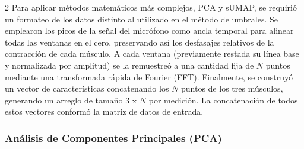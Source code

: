\documentclass[11pt, letterpaper]{article}
\begin{document}
\begin{multicols*}{2}
Para aplicar métodos matemáticos más complejos, PCA y sUMAP, se requirió un formateo de los datos distinto al utilizado en el método de umbrales. Se emplearon los picos de la señal del micrófono como ancla temporal para alinear todas las ventanas en el cero, preservando así los desfasajes relativos de la contracción de cada músculo. A cada ventana (previamente restada su línea base y normalizada por amplitud) se la remuestreó a una cantidad fija de $N$ puntos mediante una transformada rápida de Fourier (FFT). Finalmente, se construyó un vector de características concatenando los $N$ puntos de los tres músculos, generando un arreglo de tamaño $3$ x $N$ por medición. La concatenación de todos estos vectores conformó la matriz de datos de entrada.


\subsubsection*{Análisis de Componentes Principales (PCA)}
  

\end{multicols*}
\end{document}
